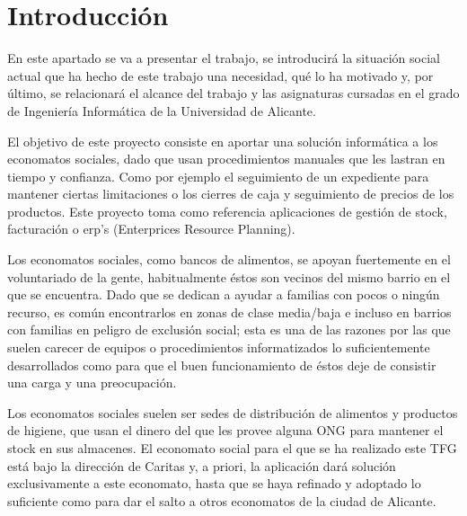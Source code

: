 
\chapter{Introducción}
En este apartado se va a presentar el trabajo, se introducirá la situación social actual que ha hecho de este trabajo una necesidad, qué lo ha motivado y, por último, se relacionará el alcance del trabajo y las asignaturas cursadas en el grado de Ingeniería Informática de la Universidad de Alicante.
\vspace{1em}
\par El objetivo de este proyecto consiste en aportar una solución informática a los economatos sociales, dado que usan procedimientos manuales que les lastran en tiempo y confianza. Como por ejemplo el seguimiento de un expediente para mantener ciertas limitaciones o los cierres de caja y seguimiento de precios de los productos. Este proyecto toma como referencia aplicaciones de gestión de stock, facturación o erp's (Enterprices Resource Planning).
\vspace{1em}
\par Los economatos sociales, como bancos de alimentos, se apoyan fuertemente en el voluntariado de la gente, habitualmente éstos son vecinos del mismo barrio en el que se encuentra. Dado que se dedican a ayudar a familias con pocos o ningún recurso, es común encontrarlos en zonas de clase media/baja e incluso en barrios con familias en peligro de exclusión social; esta es una de las razones por las que suelen carecer de equipos o procedimientos informatizados lo suficientemente desarrollados como para que el buen funcionamiento de éstos deje de consistir una carga y una preocupación.
\vspace{1em}
\par Los economatos sociales suelen ser sedes de distribución de alimentos y productos de higiene, que usan el dinero del que les provee alguna ONG para mantener el stock en sus almacenes. El economato social para el que se ha realizado este TFG está bajo la dirección de Caritas y, a priori, la aplicación dará solución exclusivamente a este economato, hasta que se haya refinado y adoptado lo suficiente como para dar el salto a otros economatos de la ciudad de Alicante.
